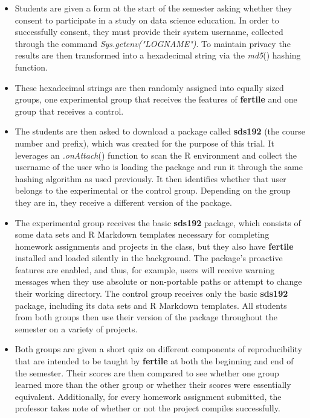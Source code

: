 \documentclass[APA,LATO1COL]{WileyNJD-v2}\usepackage[]{graphicx}\usepackage[]{color}
\newcommand{\R}{\textsf{R}\xspace}
\newcommand{\cmd}[1]{\textit{#1}}
\newcommand{\pkg}[1]{\textbf{#1}}
\newcommand{\func}[1]{\textit{#1}()}
\begin{document}
\begin{itemize}[noitemsep]

\item Students are given a form at the start of the semester asking whether they consent to participate in a study on data science education. In order to successfully consent, they must provide their system username, collected through the command \cmd{Sys.getenv("LOGNAME")}. To maintain privacy the results are then transformed into a hexadecimal string via the \func{md5} hashing function. 

\item These hexadecimal strings are then randomly assigned into equally sized groups, one experimental group that receives the features of \pkg{fertile} and one group that receives a control.

\item The students are then asked to download a package called \pkg{sds192} (the course number and prefix), which was created for the purpose of this trial. It leverages an \func{.onAttach} function to scan the \R environment and collect the username of the user who is loading the package and run it through the same hashing algorithm as used previously. It then identifies whether that user belongs to the experimental or the control group. Depending on the group they are in, they receive a different version of the package.

\item The experimental group receives the basic \pkg{sds192} package, which consists of some data sets and \R Markdown templates necessary for completing homework assignments and projects in the class, but they also have \pkg{fertile} installed and loaded silently in the background. The package's proactive features are enabled, and thus, for example, users will receive warning messages when they use absolute or non-portable paths or attempt to change their working directory. The control group receives only the basic \pkg{sds192} package, including its data sets and \R Markdown templates. All students from both groups then use their version of the package throughout the semester on a variety of projects.

\item Both groups are given a short quiz on different components of reproducibility that are intended to be taught by \pkg{fertile} at both the beginning and end of the semester. Their scores are then compared to see whether one group learned more than the other group or whether their scores were essentially equivalent. Additionally, for every homework assignment submitted, the professor takes note of whether or not the project compiles successfully.

\end{itemize}
\end{document}
